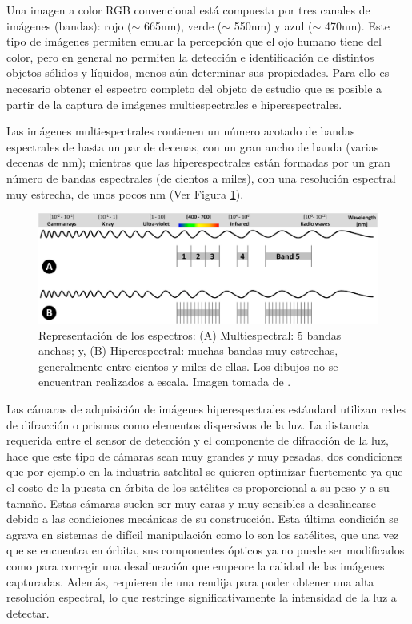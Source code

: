 \documentclass{ctuthesis}
\begin{document}
\hspace{0.5cm}Una imagen a color RGB convencional está compuesta por tres 
canales de 
imágenes (bandas): rojo 
($\sim$ 665nm), verde ($\sim$ 550nm) y azul ($\sim$ 470nm). Este tipo de 
imágenes permiten emular la percepción que el ojo humano tiene del color, pero 
en general no permiten la detección e identificación de distintos objetos 
sólidos y 
líquidos, menos 
aún determinar sus propiedades. Para ello 
es necesario obtener el espectro completo del objeto de estudio que es posible 
a partir de la captura de imágenes multiespectrales e hiperespectrales.

Las imágenes multiespectrales contienen un número acotado de bandas espectrales 
de hasta un par de decenas, con un gran ancho de banda (varias decenas de nm); 
mientras que las hiperespectrales están formadas por un gran número de bandas 
espectrales (de cientos a miles), con una resolución espectral muy estrecha, de 
unos pocos nm (Ver Figura \ref{fig:spectrus}).


\begin{figure}[H]
	\centering
	\includegraphics[scale=0.2]{Figs/plan_de_tesis/multivshyper.png}
	\caption{ Representación de los espectros: (A) Multiespectral: 5 
		bandas anchas; y, (B) Hiperespectral: muchas bandas muy estrechas, 
		generalmente entre cientos y miles de ellas. Los dibujos no se 
		encuentran 
		realizados a escala. Imagen tomada de \cite{Adao2017}.}
	\label{fig:spectrus}
\end{figure}


Las cámaras de adquisición de imágenes hiperespectrales estándard utilizan 
redes de difracción o prismas como elementos dispersivos de la luz. La 
distancia requerida entre el sensor de detección y  el componente de difracción 
de la luz, hace que este tipo de cámaras sean muy grandes y muy pesadas, dos 
condiciones que por ejemplo en la industria satelital se quieren optimizar 
fuertemente ya que el costo de la puesta en órbita de los satélites es 
proporcional a su peso y a su tamaño. Estas cámaras suelen ser muy caras y muy 
sensibles a desalinearse debido a las condiciones mecánicas de su construcción. 
Esta última condición se agrava en sistemas de difícil manipulación como lo son 
los satélites, que una vez que se encuentra en órbita, sus componentes ópticos 
ya no puede ser modificados como para corregir una desalineación que empeore la 
calidad de las imágenes capturadas. Además, requieren de una rendija 
para poder obtener una alta resolución espectral, lo que restringe 
significativamente la intensidad de la luz a detectar.
\end{document}
